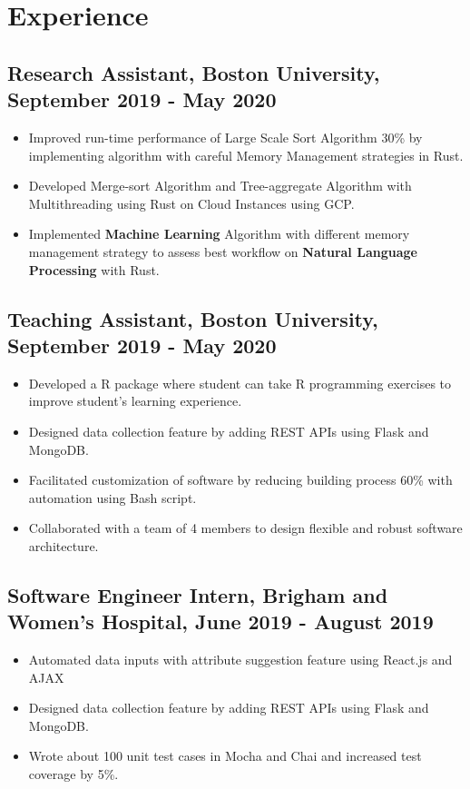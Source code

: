 \section*{Experience} 
\subsection*{Research Assistant, Boston University, September 2019 - May 2020}
\begin{itemize}
    \item  Improved run-time performance of Large Scale Sort Algorithm 30\% by implementing algorithm with careful Memory Management strategies in Rust.
    \item  Developed Merge-sort Algorithm and Tree-aggregate Algorithm with Multithreading using Rust on Cloud Instances using GCP.
    \item Implemented \textbf{Machine Learning} Algorithm with different memory management strategy to assess best workflow on \textbf{Natural Language Processing} with Rust.
\end{itemize}

\subsection*{Teaching Assistant, Boston University, September 2019 - May 2020}
\begin{itemize}
    \item  Developed a R package where student can take R programming exercises to improve student's learning experience.
    \item  Designed data collection feature by adding REST APIs using Flask and MongoDB.
    \item  Facilitated customization of software by reducing building process 60\% with automation using Bash script.
    \item  Collaborated with a team of 4 members to design flexible and robust software architecture.
\end{itemize}

\subsection*{Software Engineer Intern, Brigham and Women's Hospital, June 2019 - August 2019}
\begin{itemize}
    \item  Automated data inputs with attribute suggestion feature using React.js and AJAX
    \item  Designed data collection feature by adding REST APIs using Flask and MongoDB.
    \item  Wrote about 100 unit test cases in Mocha and Chai and increased test coverage by 5\%.
\end{itemize}





	
